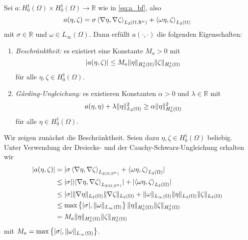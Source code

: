 \begin{Lemma}
    \label{lemma:a_bf_bounded_garding}
    Sei $a \colon H^{1}_{0}(\Omega) \times H^{1}_{0}(\Omega) \to \mathbb{R}$ wie in \eqref{eq:a_bf}, also
    \begin{equation}
        a(\eta, \zeta) = \sigma \left\langle\nabla \eta,\nabla \zeta\right\rangle_{L_{2}(\Omega, \mathbb{R}^{n})} + \left\langle\omega \eta,\zeta\right\rangle_{L_{2}(\Omega)}
    \end{equation}
    mit $\sigma \in \mathbb{R}$ und $\omega \in L_{\infty}(\Omega)$.
    Dann erfüllt $a(\cdot, \cdot)$ die folgenden Eigenschaften:
    \begin{enumerate}[label=(\arabic*),ref=(\arabic*)]
        \item \emph{Beschränktheit:} es existiert eine Konstante $M_{a} > 0$ mit
        \begin{equation}
            \lvert a(\eta, \zeta)\rvert \leq M_{a} \lVert\eta\rVert_{H^{1}_{0}(\Omega)} \lVert\zeta\rVert_{H^{1}_{0}(\Omega)}
        \end{equation}
        für alle $\eta, \zeta \in H^{1}_{0}(\Omega)$.
        \label{lemma:a_bf_bounded_garding:1}
        \item \emph{G\aa{}rding-Ungleichung:} es existieren Konstanten $\alpha > 0$ und $\lambda \in \mathbb{R}$ mit
        \begin{equation}
                a(\eta, \eta) + \lambda \lVert\eta\rVert_{L_{2}(\Omega)}^{2} \geq \alpha \lVert\eta\rVert_{H^{1}_{0}(\Omega)}^{2}
        \end{equation}
        für alle $\eta \in H^{1}_{0}(\Omega)$.
        \label{lemma:a_bf_bounded_garding:2}
    \end{enumerate}

    \begin{Beweis}
    Wir zeigen zunächst die Beschränktheit.
    Seien dazu $\eta, \zeta \in H^{1}_{0}(\Omega)$ beliebig.
    Unter Verwendung der Dreiecks- und der Cauchy-Schwarz-Ungleichung erhalten wir
    \begin{align}
        \lvert a(\eta, \zeta)\rvert
        &= \lvert\sigma \left\langle\nabla \eta,\nabla \zeta\right\rangle_{L_{2(\Omega, \mathbb{R}^{n})}} + \left\langle\omega \eta,\zeta\right\rangle_{L_{2}(\Omega)}\rvert
        \\&\leq \lvert\sigma\rvert \lvert\left\langle\nabla \eta,\nabla \zeta\right\rangle_{L_{2(\Omega, \mathbb{R}^{n})}}\rvert + \lvert\left\langle\omega \eta,\zeta\right\rangle_{L_{2}(\Omega)}\rvert
        \\&\leq \lvert\sigma\rvert \lVert\nabla \eta\rVert_{L_{2}(\Omega)} \lVert\nabla \zeta\rVert_{L_{2}(\Omega)} + \lVert\omega\rVert_{L_{\infty}(\Omega)} \lVert\eta\rVert_{L_{2}(\Omega)} \lVert\zeta\rVert_{L_{2}(\Omega)}
        \\&\leq \max \left\{ \lvert\sigma\rvert, \lVert\omega\rVert_{L_{\infty}(\Omega)} \right\} \lVert\eta\rVert_{H^{1}_{0}(\Omega)} \lVert\zeta\rVert_{H^{1}_{0}(\Omega)}
        \\&= M_{a} \lVert\eta\rVert_{H^{1}_{0}(\Omega)} \lVert\zeta\rVert_{H^{1}_{0}(\Omega)}
    \end{align}
    mit $M_{a} = \max \left\{ \lvert\sigma\rvert, \lVert\omega\rVert_{L_{\infty}(\Omega)} \right\}$.


\end{Beweis}
\end{Lemma}
